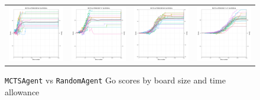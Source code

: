 \begin{figure}
\begin{tabular}{cccc}
\hspace{-0.5cm}\includegraphics[width = 1.55in]{images/Visualizations/MCTSvsRANDOM/8000ms5x5.png} &
\hspace{-0.5cm}\includegraphics[width = 1.55in]{images/Visualizations/MCTSvsRANDOM/8000ms7x7.png} &
\hspace{-0.5cm}\includegraphics[width = 1.55in]{images/Visualizations/MCTSvsRANDOM/8000ms9x9.png} &
\hspace{-0.5cm}\includegraphics[width = 1.55in]{images/Visualizations/MCTSvsRANDOM/8000ms11x11.png} \\
\end{tabular}
\caption{\texttt{MCTSAgent} vs \texttt{RandomAgent} Go scores by board size and time allowance}
\label{app:mctsrandscore}
\end{figure}

